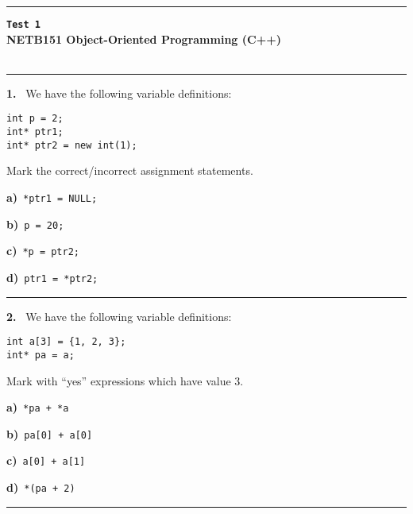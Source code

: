 \newpage\thispagestyle{empty}\par 
\hrule 
\begin{center}
{\bf\large {}}\hfill {\bf\large\verb|Test 1|}
 \hfill{\bf\large {}}\\ 
{\bf\large NETB151 Object-Oriented Programming (C++)}\\[4pt]
{\bf \large {}}\\ 
\end{center}\par
 \vspace{-4mm}
\begin{multicols}{2}
\par\smallskip\hrule\par\medskip

{\bf 1. }\ We have the following variable definitions:
 \vspace{-3mm}\begin{verbatim}
int p = 2;
int* ptr1;
int* ptr2 = new int(1);
 \end{verbatim}\vspace{-6mm}
Mark the correct/incorrect assignment statements.

{\bf a)}\ \verb|*ptr1 = NULL;|

{\bf b)}\ \verb|p = 20;|

{\bf c)}\ \verb|*p = ptr2;|

{\bf d)}\ \verb|ptr1 = *ptr2;|

\par\smallskip\hrule\par\medskip

{\bf 2. }\ We have the following variable definitions:
 \vspace{-3mm}\begin{verbatim}
int a[3] = {1, 2, 3};
int* pa = a;
 \end{verbatim}\vspace{-6mm}
Mark with ``yes'' expressions which have value 3.

{\bf a)}\ \verb|*pa + *a|

{\bf b)}\ \verb|pa[0] + a[0]|

{\bf c)}\ \verb|a[0] + a[1]|

{\bf d)}\ \verb|*(pa + 2)|

\par\smallskip\hrule\par\medskip


\end{multicols}
